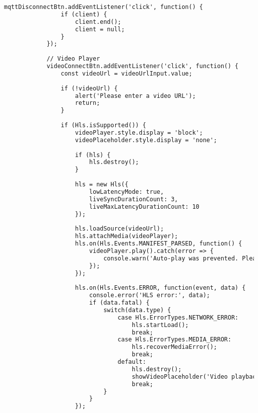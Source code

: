 \begin{lstlisting}[language=html]
            mqttDisconnectBtn.addEventListener('click', function() {
                if (client) {
                    client.end();
                    client = null;
                }
            });
    
            // Video Player
            videoConnectBtn.addEventListener('click', function() {
                const videoUrl = videoUrlInput.value;
                
                if (!videoUrl) {
                    alert('Please enter a video URL');
                    return;
                }
                
                if (Hls.isSupported()) {
                    videoPlayer.style.display = 'block';
                    videoPlaceholder.style.display = 'none';
                    
                    if (hls) {
                        hls.destroy();
                    }
                    
                    hls = new Hls({
                        lowLatencyMode: true,
                        liveSyncDurationCount: 3,
                        liveMaxLatencyDurationCount: 10
                    });
                    
                    hls.loadSource(videoUrl);
                    hls.attachMedia(videoPlayer);
                    hls.on(Hls.Events.MANIFEST_PARSED, function() {
                        videoPlayer.play().catch(error => {
                            console.warn('Auto-play was prevented. Please interact with the document first:', error);
                        });
                    });
                    
                    hls.on(Hls.Events.ERROR, function(event, data) {
                        console.error('HLS error:', data);
                        if (data.fatal) {
                            switch(data.type) {
                                case Hls.ErrorTypes.NETWORK_ERROR:
                                    hls.startLoad();
                                    break;
                                case Hls.ErrorTypes.MEDIA_ERROR:
                                    hls.recoverMediaError();
                                    break;
                                default:
                                    hls.destroy();
                                    showVideoPlaceholder('Video playback error: ' + data.details);
                                    break;
                            }
                        }
                    });
                    

\end{lstlisting}
